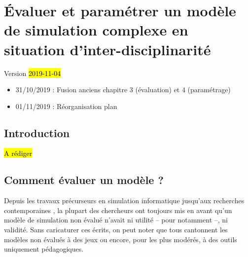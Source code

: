 \chapter{Évaluer et paramétrer un modèle de simulation complexe en situation d'inter-disciplinarité}
\label{chap:chap3}
\begin{center}
{\large Version \hl{2019-11-04}}
\end{center}
\begin{itemize}
	\item 31/10/2019 : Fusion anciens chapitre 3 (évaluation) et 4 (paramétrage)
	\item 01/11/2019 : Réorganisation plan
\end{itemize}


\minitoc
\clearpage

\section*{Introduction}
\label{sec:chap3-4-intro}

\begin{center}
	\hl{A rédiger}
\end{center}


\section{Comment évaluer un modèle ?}\label{sec:evaluer-modele}

Depuis les travaux précurseurs en simulation informatique \autocite{naylor_verification_1967,hermann_validation_1967,sargent_validation_1979} jusqu'aux recherches contemporaines \autocite{amblard_evaluation_2006,banos_pour_2013,augusiak_merging_2014, rey-coyrehourcq_plateforme_2015}, la plupart des chercheurs ont toujours mis en avant qu'un modèle de simulation non évalué n'avait ni utilité -- pour \cite{naylor_verification_1967} notamment --, ni validité.
Sans caricaturer ces écrits, on peut noter que tous cantonnent les modèles non évalués à des \og jeux\fg{} ou encore, pour les plus modérés, à des outils uniquement pédagogiques.

